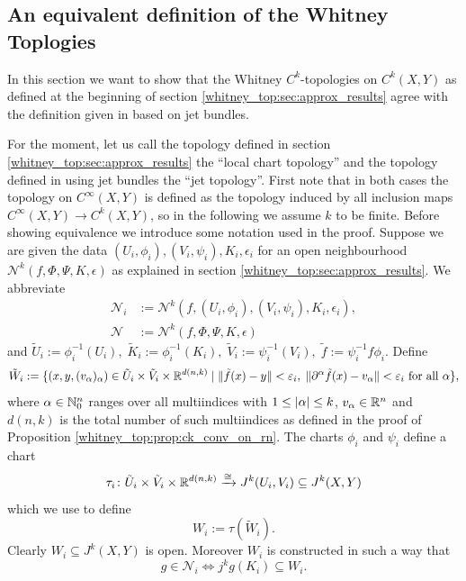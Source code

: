\subsection{An equivalent definition of the Whitney Toplogies}
\label{whitney_top:sec:equivalent_def}

In this section we want to show that the Whitney $C^k$-topologies on $C^k(X,Y)$ as defined at the beginning of section \ref{whitney_top:sec:approx_results} agree with the definition given in \cite{golubitsky2012stable} based on jet bundles.

For the moment, let us call the topology defined in section \ref{whitney_top:sec:approx_results} the ``local chart topology'' and the topology defined in \cite{golubitsky2012stable} using jet bundles the ``jet topology''. First note that in both cases the topology on $C^\infty(X,Y)$ is defined as the topology induced by all inclusion maps $C^\infty(X,Y) \to C^k(X,Y)$, so in the following we assume $k$ to be finite. Before showing equivalence we introduce some notation used in the proof. Suppose we are given the data $(U_i,\phi_i),(V_i,\psi_i),K_i,\epsilon_i$ for an open neighbourhood $\mathcal{N}^k(f,\Phi,\Psi,K,\epsilon)$ as explained in section \ref{whitney_top:sec:approx_results}. We abbreviate 
\begin{align*}
    \mathcal{N}_i &:= \mathcal{N}^k(f,(U_i,\phi_i),(V_i,\psi_i),K_i,\epsilon_i), \\ \mathcal{N} &:= \mathcal{N}^k(f,\Phi,\Psi,K,\epsilon)
\end{align*}
and $ \tilde{U}_i := \phi_i^{-1}(U_i), \;
\tilde{K}_i := \phi_i^{-1}(K_i), \;
\tilde{V}_i := \psi_i^{-1}(V_i), \;
\tilde{f} := \psi_i^{-1} f \phi_i. $
Define
\[
\tilde{W}_i := \{(x,y,(v_\alpha)_{\alpha}) \in 
\tilde{U}_i \times \tilde{V}_i \times \mathbb{R}^{d(n,k)} 
\mid 
\lVert\tilde{f}(x) - y\rVert < \varepsilon_i, \;
\lVert\partial^\alpha \tilde{f}(x) - v_\alpha\rVert < \varepsilon_i \text{ for all } \alpha
\},
\]
where $\alpha \in \mathbb{N}_0^n$ ranges over all multiindices with $1 \leq \lvert\alpha\rvert \leq k$, $v_\alpha \in \mathbb{R}^n$ and $d(n,k)$ is the total number of such multiindices as defined in the proof of Proposition \ref{whitney_top:prop:ck_conv_on_rn}. The charts $\phi_i$ and $\psi_i$ define a chart 
\[
\tau_i \colon \tilde{U}_i \times \tilde{V}_i \times \mathbb{R}^{d(n,k)} \xrightarrow{\cong} J^k(U_i,V_i) \subseteq J^k(X,Y)
\]
which we use to define 
\[
W_i := \tau(\tilde{W}_i).
\]
Clearly $W_i \subseteq J^k(X,Y)$ is open. Moreover $W_i$ is constructed in such a way that 
\begin{equation}
    \label{whitney_top:eq:eq1}
g \in \mathcal{N}_i \Leftrightarrow j^kg(K_i) \subseteq W_i.
\end{equation}

